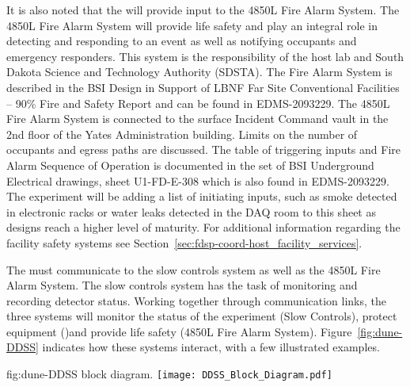It is also noted that the  will provide input to the 4850L
Fire Alarm System.  The 4850L Fire Alarm System will provide life
safety and play an integral role in detecting and responding to an
event as well as notifying occupants and emergency responders.  This
system is the responsibility of the host lab and South Dakota Science
and Technology Authority (SDSTA).  The Fire Alarm System is described
in the BSI Design in Support of LBNF Far Site Conventional Facilities
-- 90\% Fire and Safety Report and can be found in EDMS-2093229\cite{bib:cernedms2093229}. The
4850L Fire Alarm System is connected to the surface Incident Command
vault in the 2nd floor of the Yates Administration building. Limits on
the number of occupants and egress paths are discussed. The table of
triggering inputs and Fire Alarm Sequence of Operation is documented
in the set of BSI Underground Electrical drawings, sheet U1-FD-E-308
which is also found in EDMS-2093229\cite{bib:cernedms2093229}. The experiment will be adding a
list of initiating inputs, such as smoke detected in electronic racks
or water leaks detected in the DAQ room to this sheet as designs reach
a higher level of maturity. For additional information regarding the
facility safety systems see Section~\ref{sec:fdsp-coord-host_facility_services}.
 
The  must communicate to the  slow controls
system as well as the 4850L Fire Alarm System.  The  slow
controls system has the task of monitoring and recording detector
status.  Working together through communication links, the three
systems will monitor the status of the experiment (Slow Controls),
protect equipment ()and provide life safety (4850L Fire
Alarm System). Figure~\ref{fig:dune-DDSS} indicates how these systems
interact, with a few illustrated examples.
\begin{dunefigure}{fig:dune-DDSS}
  { block diagram.}
  \texttt{[image: DDSS\_Block\_Diagram.pdf]}
\end{dunefigure}


